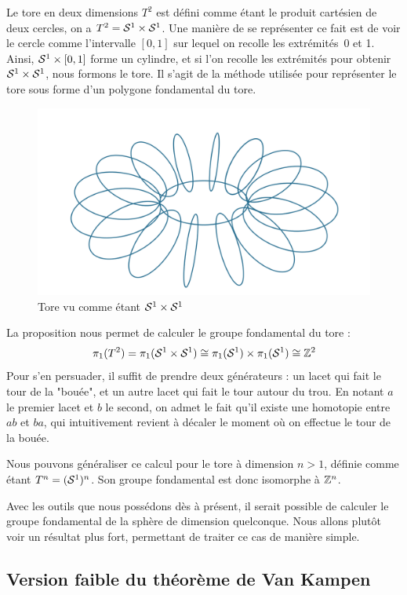 \begin{exemple}
Le tore en deux dimensions $T^2$ est défini comme étant le produit cartésien de deux cercles, on a $T^2=\mathcal{S}^{1}\times\mathcal{S}^{1}$. Une manière de se représenter ce fait est de voir le cercle comme l'intervalle $[0,1]$ sur lequel on recolle les extrémités~0 et 1. Ainsi, $\mathcal{S}^{1}\times[0,1]$ forme un cylindre, et si l'on recolle les extrémités pour obtenir $\mathcal{S}^{1}\times\mathcal{S}^{1}$, nous formons le tore. Il s'agit de la méthode utilisée pour représenter le tore sous forme d'un polygone fondamental du tore.

\begin{figure}[H]
     \centering
     \includegraphics[width=0.5\linewidth]{pictures/TorusCircle_ManimCE_v0.18.1.png}
     \caption{Tore vu comme étant $\mathcal{S}^{1}\times\mathcal{S}^{1}$}
     \label{fig:torus-circle}
 \end{figure} 

La proposition nous permet de calculer le groupe fondamental du tore : \[\pi_1(T^2)=\pi_1(\mathcal{S}^{1}\times\mathcal{S}^{1})\cong\pi_1(\mathcal{S}^{1})\times\pi_1(\mathcal{S}^{1})\cong\mathbb{Z}^2\]Pour s'en persuader, il suffit de prendre deux générateurs : un lacet qui fait le tour de la "bouée", et un autre lacet qui fait le tour autour du trou. En notant $a$ le premier lacet et $b$ le second, on admet le fait qu'il existe une homotopie entre $ab$ et $ba$, qui intuitivement revient à décaler le moment où on effectue le tour de la bouée.

Nous pouvons généraliser ce calcul pour le tore à dimension $n>1$, définie comme étant $T^n=(\mathcal{S}^{1})^n$. Son groupe fondamental est donc isomorphe à $\mathbb{Z}^n$.
\end{exemple}

Avec les outils que nous possédons dès à présent, il serait possible de calculer le groupe fondamental de la sphère de dimension quelconque. Nous allons plutôt voir un résultat plus fort, permettant de traiter ce cas de manière simple.

\subsection{Version faible du théorème de Van Kampen}

